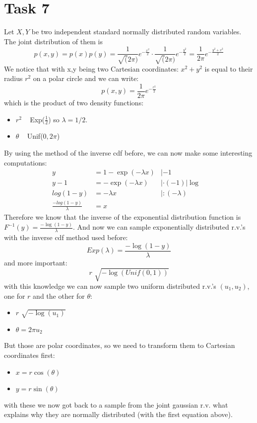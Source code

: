 \documentclass{article}
\begin{document}
\section{Task 7}
Let $X, Y$ be two independent standard normally distributed random variables. The joint distribution of them is
\[p(x,y) = p(x)p(y) = \frac{1}{\sqrt(2\pi)} e^{-\frac{x^2}{2}} \cdot \frac{1}{\sqrt(2\pi)} e^{-\frac{y^2}{2}} =  \frac{1}{2\pi} e^{-\frac{y^2 + x^2}{2}}\]
We notice that with x,y being two Cartesian coordinates: $x^2 + y^2$ is equal to their radius $r^2$ on a polar circle and we can write:
\[ p(x,y) = \frac{1}{2\pi} e^{-\frac{r^2}{2}}\]
which is the product of two density functions:
\begin{itemize}
	\item $r^2$ ~ Exp($\frac{1}{2}$) so $\lambda = 1/2$.
	\item $\theta$ ~ Unif($0,2\pi$)
\end{itemize}
By using the method of the inverse cdf before, we can now make some interesting computations:
\begin{align*}
y &= 1-\exp(-\lambda x) &|-1&\\
y-1 &= -\exp(-\lambda x) &|\cdot(-1) |\log&\\
log(1-y) &= -\lambda x &|: (-\lambda) &\\
\frac{-log(1-y)}{\lambda} &= x &&
\end{align*}
Therefore we know that the inverse of the exponential distribution function is $F^{-1}(y) = \frac{-\log(1-y)}{\lambda}$. And now we can sample exponentially distributed r.v.'s with the inverse cdf method used before:
\[Exp(\lambda) = \frac{-\log(1-y)}{\lambda} \]
and more important:
\[r\text{~}\sqrt{-\log(Unif(0,1))}\]
with this knowledge we can now sample two uniform distributed r.v.'s $(u_1, u_2)$, one for  $r$ and the other for $\theta$:
\begin{itemize}
	\item $r\text{~}\sqrt{-\log(u_1)}$
	\item $\theta = 2\pi u_2$
\end{itemize}
But those are polar coordinates, so we need to transform them to Cartesian coordinates first:
\begin{itemize}
	\item $x = r \cos (\theta)$
	\item $y = r \sin (\theta)$
\end{itemize}
with these we now got back to a sample from the joint gaussian r.v. what explains why they are normally distributed (with the first equation above).
\end{document}
